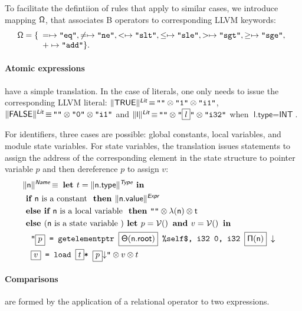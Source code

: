 \documentclass{llncs}
\newcommand{\trad}[2]{\ensuremath{\lVert \textsf{#1} \rVert^{\textit{#2}}}}
\newcommand{\nl}[0]{\ensuremath{\downarrow}}
\DeclareMathOperator{\isdef}{\equiv}
\DeclareMathOperator{\variable}{\mathcal{V}()}
\newcommand{\llvm}[1]{\texttt{#1}}
\newcommand{\B}[1]{\textsf{#1}}
\newcommand{\IF}[0]{\textbf{ if }}
\newcommand{\ELSIF}[0]{\textbf{ else if }}
\newcommand{\ELSE}[0]{\textbf{ else }}
\newcommand{\THEN}[0]{\textbf{ then }}
\newcommand{\LET}[0]{\textbf{ let }}
\newcommand{\IN}[0]{\textbf{ in }}
\newcommand{\AND}[0]{\textbf{ and }}
\newcommand{\PH}[1]{\framebox{$#1$}}
\newcommand{\sep}[0]{\otimes}
\newcommand{\local}[0]{\ensuremath{\sf\lambda}}
\newcommand{\opmap}[0]{\ensuremath{\sf\Omega}}
\newcommand{\idx}[0]{\ensuremath{\sf\Pi}}
\newcommand{\state}[0]{\ensuremath{\sf\Theta}}
\begin{document}
\begin{enumerate}
To facilitate the defintiion of rules that apply to similar cases, we introduce
mapping $\opmap$, that associates B operators to corresponding LLVM keywords:
$$\opmap = \{ 
\begin{array}[t]{l}
  = \mapsto \llvm{"eq"}, 
  \ne \mapsto \llvm{"ne"}, 
  < \mapsto \llvm{"slt"}, 
  \le \mapsto \llvm{"sle"}, 
  > \mapsto \llvm{"sgt"}, 
  \ge \mapsto \llvm{"sge"}, \\
  + \mapsto \llvm{"add"} \}.
  \end{array}
$$

\paragraph{Atomic expressions} have a simple translation. In the case of
literals, one only needs to issue the corresponding LLVM literal:
$\trad{TRUE}{\B{Lit}} \isdef \llvm{""} \sep \llvm{"1"} \sep \llvm{"i1"}$,
$\trad{FALSE}{\B{Lit}} \isdef \llvm{""} \sep \llvm{"0"} \sep \llvm{"i1"}$ and
$\trad{l}{\B{Lit}} \isdef \llvm{""} \sep \llvm{"\PH{l}"} \sep \llvm{"i32"}$ when
$\B{l.type} = \B{INT}$.

For identifiers, three cases are possible: global constants, local variables,
and module state variables. For state variables, the translation issues
statements to assign the address of the corresponding element in the state
structure to pointer variable $p$ and then dereference $p$ to assign $v$:
\begin{align*}
\lefteqn{\trad{n}{\B{Name}} \isdef \LET t = \trad{n.type}{\B{Type}} \IN} \\
& \IF \B{n} \mbox{ is a constant } \THEN \trad{n.value}{\B{Expr}} \\
& \ELSIF \B{n} \mbox{ is a local variable } \THEN 
\llvm{""} \sep \local(\B{n}) \sep t \\
& \ELSE (\B{n} \mbox{ is a state variable }) \LET p = \variable \AND v = \variable \IN \\
& \quad \llvm{"\PH{p} = getelementptr \PH{\state(\B{n.root})} \%self\$, i32 0, i32 \PH{\idx(\B{n})} \nl} \\
& \quad \llvm{\PH{v} = load \PH{t}* \PH{p}\nl"} \sep v \sep t
\end{align*}

\paragraph{Comparisons} are formed by the application of a relational operator
to two expressions. 


\end{enumerate}
\end{document}
